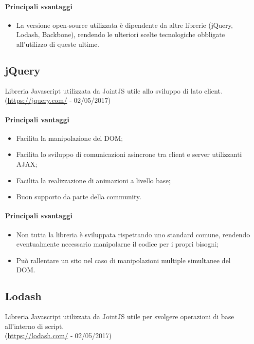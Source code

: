 \documentclass[../PianoDiQualifica.tex]{subfiles}
\begin{document}
			\paragraph{Principali svantaggi}
				\begin{itemize}
					\item La versione open-source utilizzata è dipendente da altre librerie
					(jQuery, Lodash, Backbone), rendendo le ulteriori scelte tecnologiche obbligate
					all'utilizzo di	queste ultime.
				\end{itemize}
		\subsection{jQuery}
			Libreria Javascript utilizzata da JointJS utile allo sviluppo di  lato client.\\
			(\url{https://jquery.com/} - 02/05/2017)
			\paragraph{Principali vantaggi}
			\begin{itemize}
					\item Facilita la manipolazione del DOM;
					\item Facilita lo sviluppo di comunicazioni asincrone tra client e server
					utilizzanti AJAX;
					\item Facilita la realizzazione di animazioni a livello base;
					\item Buon supporto da parte della community.
				\end{itemize}
			\paragraph{Principali svantaggi}
				\begin{itemize}
					\item Non tutta la libreria è sviluppata rispettando uno standard comune, rendendo
					eventualmente necessario manipolarne il codice per i propri bisogni;
					\item Può rallentare un sito nel caso di manipolazioni multiple simultanee del DOM.
				\end{itemize}
		\subsection{Lodash}
			Libreria Javascript utilizzata da JointJS utile per svolgere operazioni di base all'interno
			di script.\\
			(\url{https://lodash.com/} - 02/05/2017)
\end{document}
